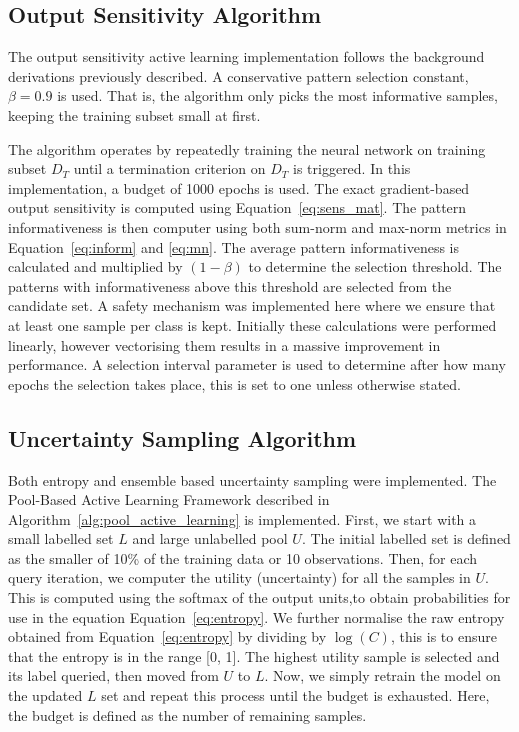 \documentclass[10pt, conference]{IEEEtran}
\begin{document}
\subsection{Output Sensitivity Algorithm}
The output sensitivity active learning implementation follows the background derivations previously described. A conservative pattern selection constant, $\beta = 0.9$ is used. That is, the algorithm only picks the most informative samples, keeping the training subset small at first. 

The algorithm operates by repeatedly training the neural network on training subset $D_T$ until a termination criterion on $D_T$ is triggered. In this implementation, a budget of 1000 epochs is used. The exact gradient-based output sensitivity is computed using Equation~\ref{eq:sens_mat}. The pattern informativeness is then computer using both sum-norm and max-norm metrics in Equation~\ref{eq:inform} and \ref{eq:mn}. The average pattern informativeness is calculated and multiplied by $(1 - \beta)$ to determine the selection threshold. The patterns with informativeness above this threshold are selected from the candidate set. A safety mechanism was implemented here where we ensure that at least one sample per class is kept. Initially these calculations were performed linearly, however vectorising them results in a massive improvement in performance. A selection interval parameter is used to determine after how many epochs the selection takes place, this is set to one unless otherwise stated.

\subsection{Uncertainty Sampling Algorithm}
Both entropy and ensemble based uncertainty sampling were implemented. The Pool-Based Active Learning Framework described in Algorithm~\ref{alg:pool_active_learning} is implemented. First, we start with a small labelled set $L$ and large unlabelled pool $U$. The initial labelled set is defined as the smaller of 10\% of the training data or 10 observations. Then, for each query iteration, we computer the utility (uncertainty) for all the samples in $U$. This is computed using the softmax of the output units,to obtain probabilities for use in the equation Equation~\ref{eq:entropy}. We further normalise the raw entropy obtained from Equation~\ref{eq:entropy} by dividing by $\log(C)$, this is to ensure that the entropy is in the range [0, 1]. The highest utility sample is selected and its label queried, then moved from $U$ to $L$. Now, we simply retrain the model on the updated $L$ set and repeat this process until the budget is exhausted. Here, the budget is defined as the number of remaining samples.
\end{document}
